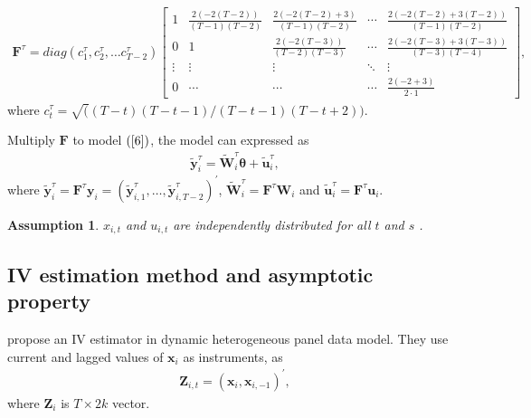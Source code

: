 \documentclass[12pt,a4paper,hyperref]{article}
\newtheorem{myAssu}{Assumption}
\begin{document}
\begin{align}
\boldsymbol{F}^{\tau}=diag(c^{\tau}_{1}, c^{\tau}_{2}, \ldots c^{\tau}_{T-2})
\begin{bmatrix}
1 & \frac{2(-2(T-2))}{(T-1)(T-2)} & \frac{2(-2(T-2)+3)}{(T-1)(T-2)} & \cdots & \frac{2(-2(T-2)+3(T-2))}{(T-1)(T-2)} \\
0 & 1 & \frac{2(-2(T-3))}{(T-2)(T-3)} & \cdots & \frac{2(-2(T-3)+3(T-3))}{(T-3)(T-4)} \\
\vdots &\vdots & \vdots & \ddots  &\vdots \\
0 & \cdots & \cdots & \cdots & \frac{2(-2+3)}{2 \cdot 1}
\end{bmatrix}, \label {7}
\end{align}   
where $c^{\tau}_{t}=\sqrt((T-t)(T-t-1)/(T-t-1)(T-t+2)).$

Multiply $\boldsymbol{F}$ to model $(\ref{6})$, the model can expressed as  
\begin{align}
\tilde{\boldsymbol{y}}^{\tau}_{i}= \tilde{\boldsymbol{W}}^{\tau}_{i}\boldsymbol{\theta}+\tilde{\boldsymbol{u}}^{\tau}_{i},
\end{align}
where $\tilde{\boldsymbol{y}}^{\tau}_{i}=\boldsymbol{F}^{\tau}\boldsymbol{y}_{i}= \left(\tilde{\boldsymbol{y}}^{\tau}_{i,1}, \ldots, \tilde{\boldsymbol{y}}^{\tau}_{i,T-2} \right)^{'}$,  $\tilde{\boldsymbol{W}}^{\tau}_{i}=\boldsymbol{F}^{\tau}\boldsymbol{W}_{i}$ and $\tilde{\boldsymbol{u}}^{\tau}_{i}=\boldsymbol{F}^{\tau}\boldsymbol{u}_{i}.$







\begin{myAssu}
$x_{i,t}$ and $u_{i,t}$ are independently distributed for all $t$ and $s$ .
\end{myAssu}







\subsection{IV estimation method and asymptotic property}
\citet{Norkute:2019} propose an IV estimator in dynamic heterogeneous panel data model. 
They use current and lagged values of $\boldsymbol{x}_{i}$ as instruments, as
\begin{align}
\boldsymbol{Z}_{i,t}=\left( \boldsymbol{x}_{i}, \boldsymbol{x}_{i,-1} \right)^{'},
\end{align}
where $\boldsymbol{Z}_{i}$ is $T \times  2k$ vector. \\
\end{document}
